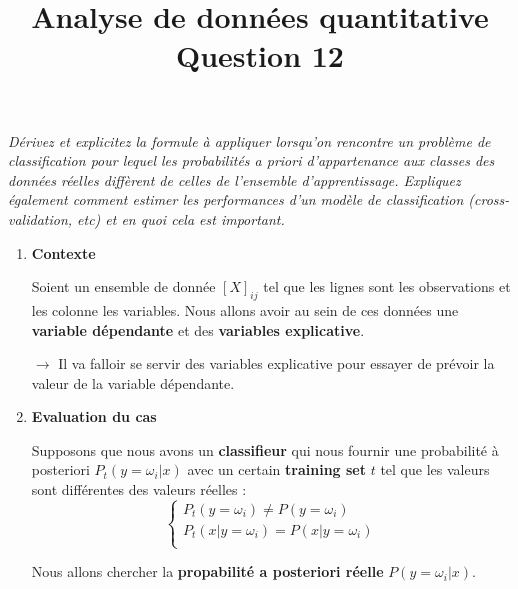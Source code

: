 \documentclass[a4paper, 11pt, onecolumn]{article}
\title{Analyse de données quantitative\\Question 12}
\date{}
\begin{document}
\maketitle

\textit{Dérivez et explicitez la formule à appliquer lorsqu’on rencontre un problème de classification pour lequel les probabilités a priori d’appartenance aux classes des données réelles diffèrent de celles de l’ensemble d’apprentissage. Expliquez également comment estimer les performances d’un modèle de classification (cross-validation, etc) et en quoi cela est important.}

\begin{enumerate}

\item \textbf{Contexte}

  Soient un ensemble de donnée $[X]_{ij}$ tel que les lignes sont les observations et les colonne les variables. Nous allons avoir au sein de ces données une \textbf{variable dépendante} et des 
  \textbf{variables explicative}. 

  $\rightarrow$ Il va falloir se servir des variables explicative pour essayer de prévoir la valeur de la variable dépendante.

\item \textbf{Evaluation du cas}

  Supposons que nous avons un \textbf{classifieur} qui nous fournir une probabilité à posteriori $P_t(y=\omega_i|x)$ avec un certain \textbf{training set} $t$ tel que les valeurs sont
  différentes des valeurs réelles :
$$
\left\{
\begin{array}{l}
P_t(y=\omega_i) \neq P(y=\omega_i)\\
P_t(x|y=\omega_i) = P(x|y=\omega_i)\\
\end{array}
\right.
$$

\begin{framed}
  Nous allons chercher la \textbf{propabilité a posteriori réelle} $P(y=\omega_i|x)$. 
  

\end{framed}
\end{enumerate}
\end{document}
